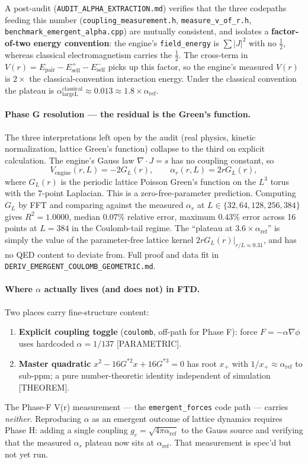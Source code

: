 \documentclass[11pt,letterpaper]{article}
\newcommand{\alphaLargeL}{\alpha_{\mathrm{largeL}}}
\begin{document}
A post-audit
(\texttt{AUDIT\_ALPHA\_EXTRACTION.md}) verifies that the three
codepaths feeding this number (\verb|coupling_measurement.h|,
\verb|measure_v_of_r.h|, \verb|benchmark_emergent_alpha.cpp|) are
mutually consistent, and isolates a \textbf{factor-of-two energy
convention}: the engine's \verb|field_energy| is $\sum|J|^2$ with no
$\tfrac{1}{2}$, whereas classical electromagnetism carries the
$\tfrac{1}{2}$. The cross-term in
$V(r) = E_{\text{pair}} - E_{\text{self}}^+ - E_{\text{self}}^-$
picks up this factor, so the engine's measured $V(r)$ is $2\times$
the classical-convention interaction energy. Under the classical
convention the plateau is
$\alphaLargeL^{\text{classical}} \approx 0.013 \approx 1.8
\times \alpha_{\text{ref}}$.

\paragraph{Phase G resolution --- the residual is the Green's function.}
The three interpretations left open by the audit (real physics,
kinetic normalization, lattice Green's function) collapse to the
third on explicit calculation. The engine's Gauss law
$\nabla \cdot J = s$ has no coupling constant, so
\begin{equation}
V_{\text{engine}}(r, L) = -2 G_L(r),\qquad
\alpha_r(r, L) = 2 r G_L(r),
\end{equation}
where $G_L(r)$ is the periodic lattice Poisson Green's function on
the $L^3$ torus with the 7-point Laplacian. This is a
zero-free-parameter prediction. Computing $G_L$ by FFT and comparing
against the measured $\alpha_r$ at $L \in \{32, 64, 128, 256, 384\}$
gives $R^2 = 1.0000$, median $0.07\%$ relative error, maximum
$0.43\%$ error across 16 points at $L = 384$ in the Coulomb-tail
regime. The ``plateau at $3.6\times \alpha_{\text{ref}}$'' is
simply the value of the parameter-free lattice kernel
$2 r G_L(r)|_{r/L \approx 0.31}$, and has no QED content to deviate
from. Full proof and data fit in
\texttt{DERIV\_EMERGENT\_COULOMB\_GEOMETRIC.md}.

\paragraph{Where $\alpha$ actually lives (and does not) in FTD.}
Two places carry fine-structure content:
\begin{enumerate}
\item \textbf{Explicit coupling toggle} (\verb|coulomb|, off-path for
Phase F): force $F = -\alpha \nabla\phi$ uses hardcoded
$\alpha = 1/137$ [PARAMETRIC].
\item \textbf{Master quadratic} $x^2 - 16 G^{*2} x + 16 G^{*3} = 0$
has root $x_+$ with $1/x_+ \approx \alpha_{\text{ref}}$ to sub-ppm;
a pure number-theoretic identity independent of simulation
[THEOREM].
\end{enumerate}
The Phase-F V(r) measurement --- the \verb|emergent_forces| code
path --- carries \emph{neither}. Reproducing $\alpha$ as an emergent
outcome of lattice dynamics requires Phase H: adding a single coupling
$g_c = \sqrt{4\pi\alpha_{\text{ref}}}$ to the Gauss source and
verifying that the measured $\alpha_r$ plateau now sits at
$\alpha_{\text{ref}}$. That measurement is spec'd but not yet run.
\end{document}
